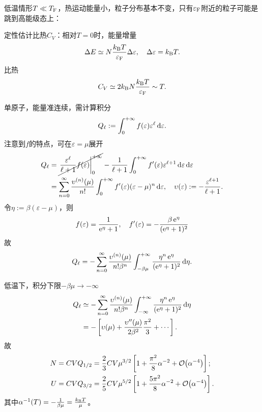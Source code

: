 低温情形$T\ll T_\mathrm F$，热运动能量小，粒子分布基本不变，只有$\varepsilon_\mathrm F$附近的粒子可能是跳到高能级态上：
\begin{center}
\end{center}
定性估计比热$C_V$：相对$T=0$时，能量增量
\[
	\Delta E\simeq N\frac{k_{\mathrm B} T}{\varepsilon_\mathrm F}\Delta\varepsilon,\quad\Delta\varepsilon=k_{\mathrm B} T.
\]
比热
\[
	C_V\simeq 2k_{\mathrm B} N\frac{k_{\mathrm B} T}{\varepsilon_\mathrm F}\sim T.
\]

单原子，能量准连续，需计算积分
\[
	Q_\ell:=\int_0^{+\infty} f(\varepsilon)\varepsilon^\ell\mathop{}\!\mathrm{d}\varepsilon.
\]
注意到$f$的特点，可在$\varepsilon=\mu$展开
\begin{align}\notag
	Q_\ell&=\cancel{\edg{\frac{\varepsilon^\ell}{\ell+1}f(\varepsilon)}\zti}-\frac1{\ell+1}\int\zti f'(\varepsilon)\varepsilon^{\ell+1}\d\varepsilon %
	\d\varepsilon\\
	&=\sum_{n=0}^\infty\frac{\upsilon^{(n)}(\mu)}{n!}\int\zti f'(\varepsilon)(\varepsilon-\mu)^n\d\varepsilon,\quad\upsilon(\varepsilon):=-\frac{\varepsilon^{\ell+1}}{\ell+1}.
\end{align}
令$\eta:=\beta(\varepsilon-\mu)$，则
\[
	f(\varepsilon)=\frac1{\mathop{}\!\mathrm{e}^\eta+1},\quad f'(\varepsilon)=-\frac{\beta\mathop{}\!\mathrm{e}^\eta}{(\mathop{}\!\mathrm{e}^\eta+1)^2}
\]
故
\[
	Q_\ell=-\sum_{n=0}^\infty\frac{\upsilon^{(n)}(\mu)}{n!\beta^n}\int_{-\beta\mu}^{+\infty}\frac{\eta^n\mathop{}\!\mathrm{e}^\eta}{(\mathop{}\!\mathrm{e}^\eta+1)^2}\mathop{}\!\mathrm{d}\eta.
\]

低温下，积分下限$-\beta\mu\to-\infty$
\begin{align*}
	Q_\ell&\simeq-\sum_{n=0}^\infty\frac{\upsilon^{(n)}(\mu)}{n!\beta^n}\int_{-\infty}^{+\infty}\frac{\eta^n\mathop{}\!\mathrm{e}^\eta}{(\mathop{}\!\mathrm{e}^\eta+1)^2}\mathop{}\!\mathrm{d}\eta\\
	&=-\left[\upsilon(\mu)+\frac{\upsilon''(\mu)}{2\beta^2}\frac{\pi^2}3+\cdots\right].
\end{align*}
故
\begin{align}
	N=CVQ_{1/2}&=\frac23CV\mu^{3/2}\left[1+\frac{\pi^2}8\alpha^{-2}+\mathcal O\!\left(\alpha^{-4}\right)\right];\\
	U=CVQ_{3/2}&=\frac25CV\mu^{5/2}\left[1+\frac{5\pi^2}8\alpha^{-2}+\mathcal O\!\left(\alpha^{-4}\right)\right].
\end{align}
其中$\alpha^{-1}(T)=-\frac1{\beta\mu}=\frac{k_{\mathrm B} T}{\mu}$。

